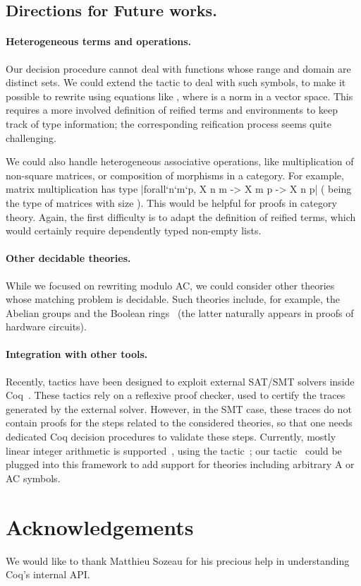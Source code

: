 \documentclass{llncs}
\begin{document}
\subsection{Directions for Future works.} 
\label{ssec:future}

\paragraph{Heterogeneous terms and operations.} 

Our decision procedure cannot deal with functions whose range and
domain are distinct sets. We could extend the tactic to deal with such
symbols, to make it possible to rewrite using equations like , where  is a norm in a
vector space. This requires a more involved definition of reified
terms and environments to keep track of type information; the
corresponding reification process seems quite challenging.

We could also handle heterogeneous associative operations, like
multiplication of non-square matrices, or composition of morphisms in
a category. For example, matrix multiplication has type
\coqinline|forall`n`m`p, X n m -> X m p -> X n p| ( being
the type of matrices with size ). This would be helpful for
proofs in category theory. Again, the first difficulty is to adapt the
definition of reified terms, which would certainly require dependently
typed non-empty lists.

\paragraph{Other decidable theories.} 

While we focused on rewriting modulo AC, we could consider other
theories whose matching problem is decidable. Such theories include,
for example, the Abelian groups and the Boolean rings~\cite{boudet-89}
(the latter naturally appears in proofs of hardware circuits).

\paragraph{Integration with other tools.}

Recently, tactics have been designed to exploit external SAT/SMT
solvers inside Coq~\cite{SMTCoq}. These tactics rely on a reflexive
proof checker, used to certify the traces generated by the external
solver. However, in the SMT case, these traces do not contain proofs
for the steps related to the considered theories, so that one needs
dedicated Coq decision procedures to validate these steps. Currently,
mostly linear integer arithmetic is supported~\cite{SMTCoq}, using the
 tactic~\cite{lia}; our tactic \aacreflexivity\ could be
plugged into this framework to add support for theories including
arbitrary A or AC symbols.

\section*{Acknowledgements}

We would like to thank Matthieu Sozeau for his precious help in
understanding Coq's internal API.


\end{document}
